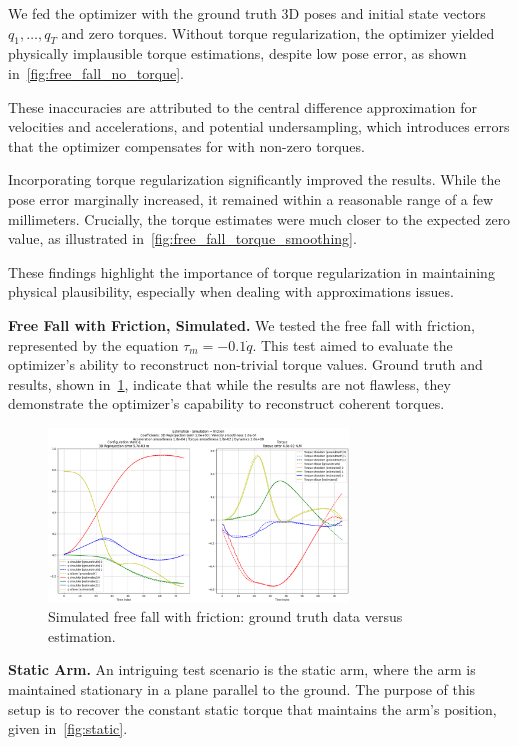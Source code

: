We fed the optimizer with the ground truth 3D poses and initial state vectors \(q_1, \ldots, q_T\) and zero torques. Without torque 
regularization, the optimizer yielded physically implausible torque estimations, despite low pose error, as shown in~\cref{fig:free_fall_no_torque}.


These inaccuracies are attributed to the central difference approximation for velocities and accelerations, and potential undersampling, which 
introduces errors that the optimizer compensates for with non-zero torques.

Incorporating torque regularization significantly improved the results. While the pose error marginally increased, it remained within a 
reasonable range of a few millimeters. Crucially, the torque estimates were much closer to the expected zero value, as illustrated 
in~\cref{fig:free_fall_torque_smoothing}.


These findings highlight the importance of torque regularization in maintaining physical plausibility, especially when dealing with 
approximations issues.

\noindent\textbf{Free Fall with Friction, Simulated.} We tested the free fall with friction, represented by the equation 
\(\tau_m = -0.1\dot{q}\). This test aimed to evaluate the optimizer's ability to reconstruct non-trivial torque values. Ground truth and results, 
shown in~\cref{fig:free_fall_friction}, indicate that while the results are not flawless, 
they demonstrate the optimizer's capability to reconstruct coherent torques.

\begin{figure}[H]
    \centering
    \includegraphics[width=8cm]{figures/inverse_dynamics_friction_case_medium_smoothing.png}
    \caption{Simulated free fall with friction: ground truth data versus estimation.}
    \label{fig:free_fall_friction}
\end{figure}


\noindent\textbf{Static Arm.} An intriguing test scenario is the static arm, where the arm is 
maintained stationary in a plane parallel to the ground. The purpose of this setup is to recover 
the constant static torque that maintains the arm's position, given in~\cref{fig:static}.

